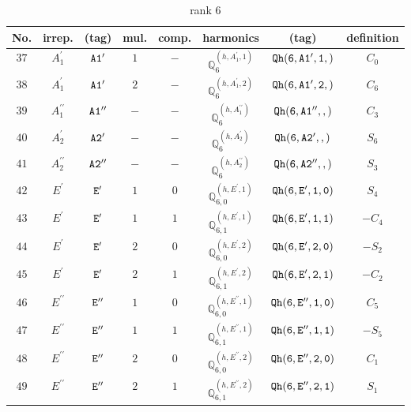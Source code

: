 \documentclass[fleqn,8pt]{jsarticle}
\begin{document}
\begin{table}[ht!]
\begin{center}
\caption{rank 6}
\renewcommand{\arraystretch}{1.3}
\begin{tabular}{cccccccc} \hline \hline
No. & irrep. & (tag) & mul. & comp. & harmonics & (tag) & definition \\ \hline
$ 37 $ & $ A_{1}^{\prime} $ & $ {\tt A1'} $ & $ 1 $ & $ - $ & $ \mathbb{Q}_{6}^{(h,A_{1}^{\prime},1)} $ & $ {\tt Qh(6,A1',1,)} $ & $ C_{0} $ \\
$ 38 $ & $ A_{1}^{\prime} $ & $ {\tt A1'} $ & $ 2 $ & $ - $ & $ \mathbb{Q}_{6}^{(h,A_{1}^{\prime},2)} $ & $ {\tt Qh(6,A1',2,)} $ & $ C_{6} $ \\
$ 39 $ & $ A_{1}^{\prime\prime} $ & $ {\tt A1''} $ & $ - $ & $ - $ & $ \mathbb{Q}_{6}^{(h,A_{1}^{\prime\prime})} $ & $ {\tt Qh(6,A1'',,)} $ & $ C_{3} $ \\
$ 40 $ & $ A_{2}^{\prime} $ & $ {\tt A2'} $ & $ - $ & $ - $ & $ \mathbb{Q}_{6}^{(h,A_{2}^{\prime})} $ & $ {\tt Qh(6,A2',,)} $ & $ S_{6} $ \\
$ 41 $ & $ A_{2}^{\prime\prime} $ & $ {\tt A2''} $ & $ - $ & $ - $ & $ \mathbb{Q}_{6}^{(h,A_{2}^{\prime\prime})} $ & $ {\tt Qh(6,A2'',,)} $ & $ S_{3} $ \\
$ 42 $ & $ E^{\prime} $ & $ {\tt E'} $ & $ 1 $ & $ 0 $ & $ \mathbb{Q}_{6,0}^{(h,E^{\prime},1)} $ & $ {\tt Qh(6,E',1,0)} $ & $ S_{4} $ \\
$ 43 $ & $ E^{\prime} $ & $ {\tt E'} $ & $ 1 $ & $ 1 $ & $ \mathbb{Q}_{6,1}^{(h,E^{\prime},1)} $ & $ {\tt Qh(6,E',1,1)} $ & $ - C_{4} $ \\
$ 44 $ & $ E^{\prime} $ & $ {\tt E'} $ & $ 2 $ & $ 0 $ & $ \mathbb{Q}_{6,0}^{(h,E^{\prime},2)} $ & $ {\tt Qh(6,E',2,0)} $ & $ - S_{2} $ \\
$ 45 $ & $ E^{\prime} $ & $ {\tt E'} $ & $ 2 $ & $ 1 $ & $ \mathbb{Q}_{6,1}^{(h,E^{\prime},2)} $ & $ {\tt Qh(6,E',2,1)} $ & $ - C_{2} $ \\
$ 46 $ & $ E^{\prime\prime} $ & $ {\tt E''} $ & $ 1 $ & $ 0 $ & $ \mathbb{Q}_{6,0}^{(h,E^{\prime\prime},1)} $ & $ {\tt Qh(6,E'',1,0)} $ & $ C_{5} $ \\
$ 47 $ & $ E^{\prime\prime} $ & $ {\tt E''} $ & $ 1 $ & $ 1 $ & $ \mathbb{Q}_{6,1}^{(h,E^{\prime\prime},1)} $ & $ {\tt Qh(6,E'',1,1)} $ & $ - S_{5} $ \\
$ 48 $ & $ E^{\prime\prime} $ & $ {\tt E''} $ & $ 2 $ & $ 0 $ & $ \mathbb{Q}_{6,0}^{(h,E^{\prime\prime},2)} $ & $ {\tt Qh(6,E'',2,0)} $ & $ C_{1} $ \\
$ 49 $ & $ E^{\prime\prime} $ & $ {\tt E''} $ & $ 2 $ & $ 1 $ & $ \mathbb{Q}_{6,1}^{(h,E^{\prime\prime},2)} $ & $ {\tt Qh(6,E'',2,1)} $ & $ S_{1} $ \\
 \hline \hline
\end{tabular}
\end{center}
\end{table}
\end{document}
